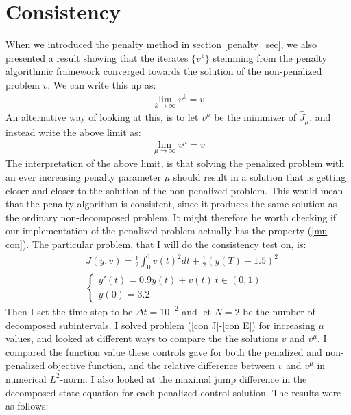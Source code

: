 \section{Consistency}
When we introduced the penalty method in section \ref{penalty_sec}, we also presented a result showing that the iterates $\{v^k\}$ stemming from the penalty algorithmic framework converged towards the solution of the non-penalized problem $v$. We can write this up as:
\begin{align*}
\lim_{k\rightarrow\infty} v^k = v 
\end{align*}  
An alternative way of looking at this, is to let $v^{\mu}$ be the minimizer of $\hat J_{\mu}$, and instead write the above limit as:
\begin{align}
\lim_{\mu\rightarrow\infty} v^{\mu} = v \label{mu con}
\end{align}
The interpretation of the above limit, is that solving the penalized problem with an ever increasing penalty parameter $\mu$ should result in a solution that is getting closer and closer to the solution of the non-penalized problem. This would mean that the penalty algorithm is consistent, since it produces the same solution as the ordinary non-decomposed problem. It might therefore be worth checking if our implementation of the penalized problem actually has the property (\ref{mu con}). The particular problem, that I will do the consistency test on, is: 
\begin{align}
&J(y,v) = \frac{1}{2}\int_0^1v(t)^2dt + \frac{1}{2}(y(T)-1.5)^2 \label{con J} \\
&\left\{
     \begin{array}{lr}
       	y'(t)=0.9y(t) + v(t) \ t\in(0,1)\\
       	y(0)=3.2
     \end{array}
   \right. \label{con E}
\end{align}
Then I set the time step to be $\Delta t = 10^{-2}$ and let $N=2$ be the number of decomposed subintervals. I solved problem (\ref{con J}-\ref{con E}) for increasing $\mu$ values, and looked at different ways to compare the the solutions $v$ and $v^{\mu}$. I compared the function value these controls gave for both the penalized and non-penalized objective function, and the relative difference between $v$ and $v^{\mu}$ in numerical $L^2$-norm. I also looked at the maximal jump difference in the decomposed state equation for each penalized control solution. The results were as follows:
\\
